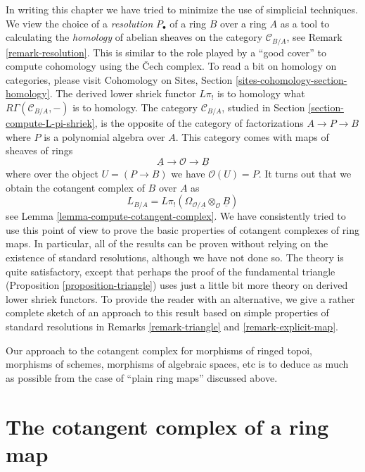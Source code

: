 \noindent
In writing this chapter we have tried to minimize
the use of simplicial techniques. We view the choice of a {\it resolution}
$P_\bullet$ of a ring $B$ over a ring $A$ as a tool to calculating the
{\it homology} of abelian sheaves on the category $\mathcal{C}_{B/A}$, see
Remark \ref{remark-resolution}. This is similar to the role played
by a ``good cover'' to compute cohomology using the {\v C}ech complex.
To read a bit on homology on categories, please visit
Cohomology on Sites, Section \ref{sites-cohomology-section-homology}.
The derived lower shriek functor $L\pi_!$ is to homology what
$R\Gamma(\mathcal{C}_{B/A}, -)$ is to homology. The category
$\mathcal{C}_{B/A}$, studied in Section \ref{section-compute-L-pi-shriek},
is the opposite of the category of factorizations $A \to P \to B$ where $P$
is a polynomial algebra over $A$. This category comes with maps of sheaves
of rings
$$
\underline{A} \longrightarrow \mathcal{O} \longrightarrow \underline{B}
$$
where over the object $U =  (P \to B)$ we have $\mathcal{O}(U) = P$. 
It turns out that we obtain the cotangent complex of $B$ over $A$ as
$$
L_{B/A} =
L\pi_!(\Omega_{\mathcal{O}/\underline{A}} \otimes_\mathcal{O} \underline{B})
$$
see Lemma \ref{lemma-compute-cotangent-complex}. We have consistently tried
to use this point of view to prove the basic properties of cotangent
complexes of ring maps. In particular, all of the results can be proven
without relying on the existence of standard resolutions, although we have
not done so. The theory is quite satisfactory, except that
perhaps the proof of the fundamental triangle
(Proposition \ref{proposition-triangle}) uses just a little
bit more theory on derived lower shriek functors.
To provide the reader with an alternative,
we give a rather complete sketch of an approach to this result
based on simple properties of standard resolutions in
Remarks \ref{remark-triangle} and \ref{remark-explicit-map}.

\medskip\noindent
Our approach to the cotangent complex for morphisms of ringed topoi,
morphisms of schemes, morphisms of algebraic spaces, etc
is to deduce as much as possible from the case of ``plain ring maps''
discussed above.





\section{The cotangent complex of a ring map}
\label{section-cotangent-ring-map}

